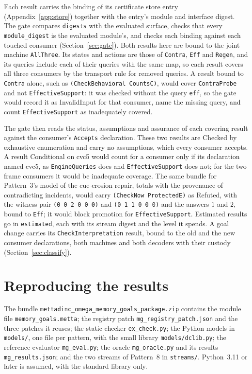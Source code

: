 \documentclass[11pt]{article}
\newcommand{\fpath}[1]{\nolinkurl{#1}}
\newcommand{\code}[1]{\texttt{#1}}
\theoremstyle{definition}
\theoremstyle{plain}
\begin{document}
Each result carries the binding of its certificate store entry (Appendix~\ref{app:store}) together with the
entry's module and interface digest. The gate compares \code{digests} with the evaluated surface,
checks that every \code{module\_digest} is the evaluated module's, and checks each binding against
each touched consumer (Section~\ref{sec:gate}). Both results here are bound to the joint machine
\code{AllThree}. Its states and actions are those of \code{Contra}, \code{Eff} and \code{Regen},
and its queries include each of their queries with the same map, so each result covers all three
consumers by the transport rule for removed queries. A result bound to \code{Contra} alone, such as
\code{(CheckBehavioral CountsC)}, would cover \code{ContraProbe} and not \code{EffectiveSupport}:
it was checked without the query \code{eff}, so the gate would record it as InvalidInput for that
consumer, name the missing query, and count \code{EffectiveSupport} as inadequately covered.

The gate then reads the status, assumptions and assurance of each covering result against the
consumer's \code{Accepts} declaration. These two results are Checked by exhaustive enumeration and
carry no assumptions, which every consumer accepts. A result Conditional on cvc5 would count for a
consumer only if its declaration named cvc5, as \code{EngineQueries} does and
\code{EffectiveSupport} does not; for the two frame consumers it would be inadequate coverage. The
same bundle for Pattern~3's model of the cue-erosion repair, totals with the provenance of
contradicting incidents, would carry \code{(CheckNow ProtectedE)} as Refuted, with the witness pair
\code{(0 0 2 0 0 0)} and \code{(0 1 1 0 0 0)} and the answers $1$ and $2$, bound to \code{Eff}; it
would block promotion for \code{EffectiveSupport}. Estimated results go in \code{estimated}, each
with its stream digest and the level it spends. A goal change carries its \code{CheckInterpretation}
result, bound to the old and the new consumer declarations, both machines and both decoders with
their custody (Section~\ref{sec:classify}).
\section{Reproducing the results}\label{app:repro}

The bundle \fpath{mettadinc_omega_memory_goals_package.zip} contains the module file
\fpath{memory_goals.metta}; the registry patch \fpath{mg_registry_patch.json} and the three patches
it reuses; the static checker \fpath{ex_check.py}; the Python models in \fpath{models/}, one file
per pattern, with the small library \fpath{models/dclib.py}; the reference evaluator
\fpath{mg_eval.py}; the oracle \fpath{mg_oracle.py} and its results \fpath{mg_results.json}; and
the two streams of Pattern~8 in \fpath{streams/}. Python~3.11 or later is assumed, with the standard
library only.
\end{document}
